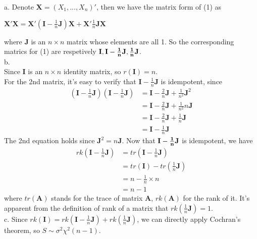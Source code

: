 \documentclass[12pt]{article}
\begin{document}
{ \vfill
\answer
}
{
a. Denote $\textbf{X} =(X_1,...,X_n)'$, then we have the matrix form of (1) as
\begin{center}
$\textbf{X}'\textbf{X}=\textbf{X}'(\textbf{I}-\frac{1}{n}\textbf{J})\textbf{X}+\textbf{X}'\frac{1}{n}\textbf{J}\textbf{X}$
\end{center}
where $\textbf{J}$ is an $n \times n$ matrix whose elements are all 1.
So the corresponding matrics for (1) are respetively $\textbf{I},\bf{I}-\frac{1}{n}\textbf{J},\frac{1}{n}\textbf{J}$.\\
b. \\
Since $\textbf{I}$ is an $n \times n$ identity matrix, so $r(\textbf{I})=n$.\\
For the 2nd matrix, it's easy to verify that $\textbf{I}-\frac{1}{n}\textbf{J}$ is idempotent, since
\begin{align*}
(\textbf{I}-\frac{1}{n}\textbf{J})(\textbf{I}-\frac{1}{n}\textbf{J})&=\textbf{I}-\frac{2}{n}\textbf{J}+\frac{1}{n^2}\textbf{J}^2\\
                                                                       &=\textbf{I}-\frac{2}{n}\textbf{J}+\frac{1}{n^2}n\textbf{J}\\
                                                                       &=\textbf{I}-\frac{2}{n}\textbf{J}+\frac{1}{n}\textbf{J}\\
                                                                       &=\textbf{I}-\frac{1}{n}\textbf{J}
\end{align*}
The 2nd equation holds since $\textbf{J}^2=n\textbf{J}$. Now that $\bf{I}-\frac{1}{n}\bf{J}$ is idempotent, we have
\begin{align*}
rk(\textbf{I}-\frac{1}{n}\textbf{J})&=tr(\textbf{I}-\frac{1}{n}\textbf{J})\\
                                                  &=tr(\textbf{I})-tr(\frac{1}{n}\textbf{J})\\
                                                  &=n-\frac{1}{n}\times n\\
                                                  &=n-1
\end{align*}
where $tr(\textbf{A})$ stands for the trace of matrix $\textbf{A}$, $rk(\textbf{A})$ for the rank of it. It's apparent from the definition of rank of a matrix that $rk(\frac{1}{n}\textbf{J})=1$.\\
c. Since $rk(\textbf{I})=rk(\textbf{I}-\frac{1}{n}\textbf{J})+rk(\frac{1}{n}\textbf{J})$, we can directly apply Cochran's theorem, so $S\sim \sigma^2 \chi^2(n-1)$.
}
\end{document}
